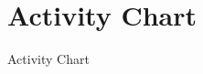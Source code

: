 \begin{figure}[h]
\section{Activity Chart}
  \centering
  \caption{Activity Chart}
  \label{fig:performance_comparison}
\end{figure}